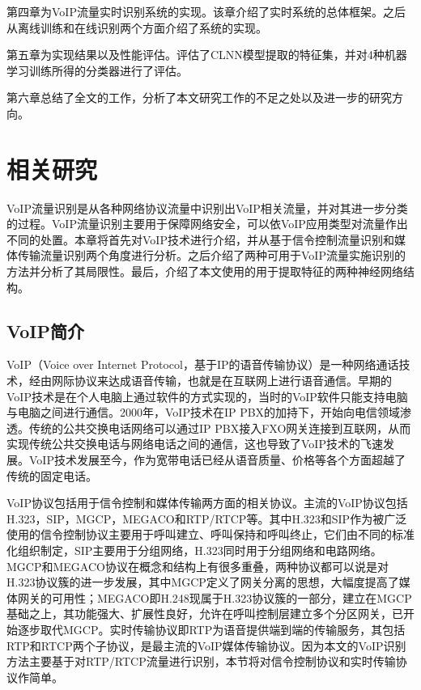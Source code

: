 第四章为VoIP流量实时识别系统的实现。该章介绍了实时系统的总体框架。之后从离线训练和在线识别两个方面介绍了系统的实现。

第五章为实现结果以及性能评估。评估了CLNN模型提取的特征集，并对4种机器学习训练所得的分类器进行了评估。

第六章总结了全文的工作，分析了本文研究工作的不足之处以及进一步的研究方向。


\chapter{相关研究}
VoIP流量识别是从各种网络协议流量中识别出VoIP相关流量，并对其进一步分类的过程。VoIP流量识别主要用于保障网络安全，可以依VoIP应用类型对流量作出不同的处置。本章将首先对VoIP技术进行介绍，并从基于信令控制流量识别和媒体传输流量识别两个角度进行分析。之后介绍了两种可用于VoIP流量实施识别的方法并分析了其局限性。最后，介绍了本文使用的用于提取特征的两种神经网络结构。

\section{VoIP简介}
VoIP（Voice over Internet Protocol，基于IP的语音传输协议）是一种网络通话技术，经由网际协议来达成语音传输，也就是在互联网上进行语音通信。早期的VoIP技术是在个人电脑上通过软件的方式实现的，当时的VoIP软件只能支持电脑与电脑之间进行通信。2000年，VoIP技术在IP PBX的加持下，开始向电信领域渗透。传统的公共交换电话网络可以通过IP PBX接入FXO网关连接到互联网，从而实现传统公共交换电话与网络电话之间的通信，这也导致了VoIP技术的飞速发展。VoIP技术发展至今，作为宽带电话已经从语音质量、价格等各个方面超越了传统的固定电话。

VoIP协议包括用于信令控制和媒体传输两方面的相关协议。主流的VoIP协议包括H.323，SIP，MGCP，MEGACO和RTP/RTCP等。其中H.323和SIP作为被广泛使用的信令控制协议主要用于呼叫建立、呼叫保持和呼叫终止，它们由不同的标准化组织制定，SIP主要用于分组网络，H.323同时用于分组网络和电路网络。MGCP和MEGACO协议在概念和结构上有很多重叠，两种协议都可以说是对H.323协议簇的进一步发展，其中MGCP定义了网关分离的思想，大幅度提高了媒体网关的可用性；MEGACO即H.248现属于H.323协议簇的一部分，建立在MGCP基础之上，其功能强大、扩展性良好，允许在呼叫控制层建立多个分区网关，已开始逐步取代MGCP。实时传输协议即RTP为语音提供端到端的传输服务，其包括RTP和RTCP两个子协议，是最主流的VoIP媒体传输协议。因为本文的VoIP识别方法主要基于对RTP/RTCP流量进行识别，本节将对信令控制协议和实时传输协议作简单。

